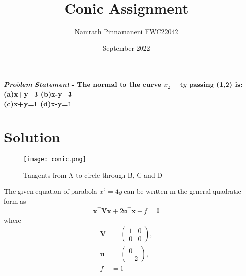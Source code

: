 \documentclass[journal,10pt,twocolumn]{article}
\title{\textbf{Conic Assignment}}
\author{Namrath Pinnamaneni \hspace{9cm} FWC22042}
\date{September 2022}
\let\vec\mathbf
\newcommand{\myvec}[1]{\ensuremath{\begin{pmatrix}#1\end{pmatrix}}}
\begin{document}
\maketitle
\paragraph{\textit{Problem Statement} - The normal to the curve \(x_2=4y\) passing (1,2) is:\\
(a)x+y=3  \hspace{2cm} (b)x-y=3\\ 
(c)x+y=1 \hspace{2cm}  (d)x-y=1\\}

\section*{\large Solution}

\begin{figure}[H]
\centering
\texttt{[image: conic.png]}
\caption{Tangents from A to circle through B, C and D}
\label{fig:triangle}
\end{figure}

The given equation of parabola $x^2 = 4y$ can be written in the general quadratic form as
\begin{align}
    \label{eq:conic_quad_form}
    \vec{x}^{\top}\vec{V}\vec{x}+2\vec{u}^{\top}\vec{x}+f=0
    \end{align}
where
\begin{align}
	\label{eq:V_matrix}
	\vec{V} &= \myvec{1 & 0\\0 & 0},
	\\
	\label{eq:u_vector}
	\vec{u} &= \myvec{0\\-2},
	\\
	\label{eq:f_value}
	f &= 0
\end{align}
\end{document}
